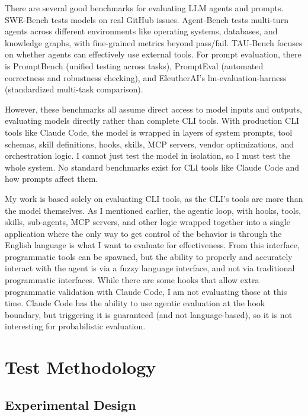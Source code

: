 \documentclass[11pt]{article}
\begin{document}
There are several good benchmarks for evaluating LLM agents and prompts. SWE-Bench\cite{jimenez2024swebench} tests
models on real GitHub issues. Agent-Bench\cite{liu2023agentbench} tests multi-turn agents across
different environments like operating systems, databases, and knowledge graphs,
with fine-grained metrics beyond pass/fail. TAU-Bench\cite{yao2024taubench} focuses on whether
agents can effectively use external tools. For prompt evaluation, there is PromptBench\cite{zhu2024promptbench} (unified testing across tasks),
PromptEval\cite{polo2024efficient} (automated correctness and robustness checking), and EleutherAI's
lm-evaluation-harness\cite{gao2024lmevalharness} (standardized multi-task comparison).

However, these benchmarks all assume direct access to model inputs and outputs, evaluating models
directly rather than complete CLI tools. With production CLI tools like Claude Code, the model is wrapped in
layers of system prompts, tool schemas, skill definitions, hooks, skills, MCP servers,
vendor optimizations, and orchestration logic. I cannot just test the model in isolation, so I must test the whole
system. No standard benchmarks exist for CLI tools like Claude Code and how prompts affect them.

My work is based solely on evaluating CLI tools, as the CLI's tools are more
than the model themselves. As I mentioned earlier, the agentic loop, with hooks,
tools, skills, sub-agents, MCP servers, and other logic wrapped together into a
single application where the only way to get control of the behavior is through
the English language is what I want to evaluate for effectiveness. From this
interface, programmatic tools can be spawned, but the ability to properly and
accurately interact with the agent is via a fuzzy language interface, and not
via traditional programmatic interfaces. While there are some hooks that allow
extra programmatic validation with Claude Code, I am not evaluating those at this
time. Claude Code has the ability to use agentic evaluation at the hook
boundary, but triggering it is guaranteed (and not language-based), so it is not
interesting for probabilistic evaluation.

\section{Test Methodology}\label{sec:methodology}

\subsection{Experimental Design}
\end{document}
